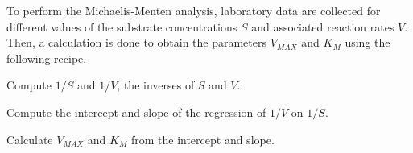 \documentclass[letterpaper,compsoc,twoside]{IEEEtran}
\begin{document}
To perform the Michaelis-Menten analysis,
laboratory data are collected for different values of the substrate concentrations
$S$ and associated reaction rates $V$.
Then, a calculation is done to obtain the parameters $V_{MAX}$ and $K_M$
using the following recipe.
\begin{list}{.}
{
\setlength{\rightmargin}{\leftmargin}
}

\item 

Compute $1/S$ and $1/V$, the inverses of $S$ and $V$.
\item 

Compute the intercept and slope of the regression of $1/V$ on
$1/S$.
\item 

Calculate $V_{MAX}$ and $K_M$ from the intercept and slope.\end{list}
\end{document}

